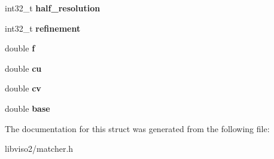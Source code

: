 \begin{DoxyCompactItemize}
\item 
\hypertarget{struct_matcher_1_1parameters_a4eb0242decd2f4b2bfd44660247b97cc}{int32\+\_\+t {\bfseries half\+\_\+resolution}}\label{struct_matcher_1_1parameters_a4eb0242decd2f4b2bfd44660247b97cc}

\item 
\hypertarget{struct_matcher_1_1parameters_ad3843c72dd15e8782fad2c169213fe8f}{int32\+\_\+t {\bfseries refinement}}\label{struct_matcher_1_1parameters_ad3843c72dd15e8782fad2c169213fe8f}

\item 
\hypertarget{struct_matcher_1_1parameters_a2dd27d4180b2fd7f761c35e44d5b3d54}{double {\bfseries f}}\label{struct_matcher_1_1parameters_a2dd27d4180b2fd7f761c35e44d5b3d54}

\item 
\hypertarget{struct_matcher_1_1parameters_ad66254c652eef7b857be5b524f2a5d5c}{double {\bfseries cu}}\label{struct_matcher_1_1parameters_ad66254c652eef7b857be5b524f2a5d5c}

\item 
\hypertarget{struct_matcher_1_1parameters_ab8c0a32ab52a943a1bbcb720528dd3ab}{double {\bfseries cv}}\label{struct_matcher_1_1parameters_ab8c0a32ab52a943a1bbcb720528dd3ab}

\item 
\hypertarget{struct_matcher_1_1parameters_a54fd8ef17d17d69591a0822a7d77ee7e}{double {\bfseries base}}\label{struct_matcher_1_1parameters_a54fd8ef17d17d69591a0822a7d77ee7e}

\end{DoxyCompactItemize}


The documentation for this struct was generated from the following file\+:\begin{DoxyCompactItemize}
\item 
libviso2/matcher.\+h\end{DoxyCompactItemize}
